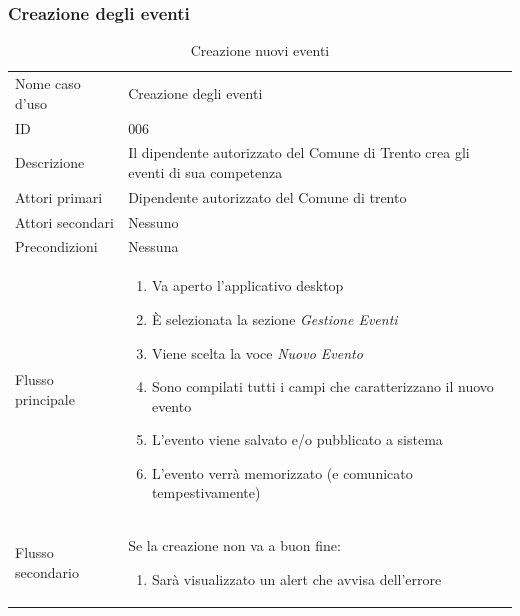\documentclass{article}
\begin{document}
\clearpage

\subsubsection{Creazione degli eventi}

\begin{table}[htbp]
    \label{8.3.2}
    \centering
    \begin{tabularx}{\textwidth}{| l | p{} |}
        \Xhline{2pt} %
        Nome caso d'uso & Creazione degli eventi \\
        \Xhline{2pt} %
        ID & 006 \\
        \hline
        Descrizione & Il dipendente autorizzato del Comune di Trento crea gli eventi di sua competenza\\
        \hline
        Attori primari & Dipendente autorizzato del Comune di trento\\
        \hline
        Attori secondari & Nessuno \\
        \hline
        Precondizioni & Nessuna \\
        \hline
        Flusso principale & 
        \begin{enumerate}[topsep=5pt,partopsep=0pt,parsep=0pt,itemsep=0pt,before=\vspace{-\baselineskip},after=\vspace{-\baselineskip}]                
            \item Va aperto l'applicativo desktop
            \item È selezionata la sezione \textit{Gestione Eventi}
            \item Viene scelta la voce \textit{Nuovo Evento}
            \item Sono compilati tutti i campi che caratterizzano il nuovo evento
            \item L'evento viene salvato e/o pubblicato a sistema
            \item L'evento verrà memorizzato (e comunicato tempestivamente)
        \end{enumerate}
        \\
        \hline
        Flusso secondario & 
        Se la creazione non va a buon fine:
        \begin{enumerate}[topsep=10pt,partopsep=0pt,parsep=0pt,itemsep=0pt,before=\vspace{-\baselineskip},after=\vspace{-\baselineskip}]                
            \item Sarà visualizzato un alert che avvisa dell'errore
        \end{enumerate}
        \\
        \hline
    \end{tabularx}
    \caption{Creazione nuovi eventi}
    \label{tab:tabella_use_case006}
\end{table}
\end{document}

